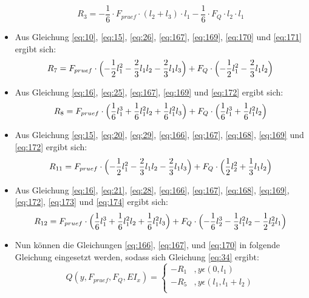 \begin{itemize}
\begin{equation}
		R_{3}=-\frac{1}{6}\cdot F_{pruef}\cdot (l_{2}+l_{3})\cdot l_{1} - \frac{1}{6}\cdot F_{Q}\cdot l_{2}\cdot l_{1}
	\end{equation}
	\item Aus Gleichung \ref{eq:10}, \ref{eq:15}, \ref{eq:26}, \ref{eq:167}, \ref{eq:169}, \ref{eq:170} und \ref{eq:171} ergibt sich:
	\begin{equation}\label{eq:172}
		R_{7}=F_{pruef}\cdot \Bigl(-\frac{1}{2} l_{1}^{2}-\frac{2}{3} l_{1}l_{2}-\frac{2}{3} l_{1}l_{3}\Bigr) + F_{Q}\cdot \Bigl(-\frac{1}{2} l_{1}^{2}-\frac{2}{3} l_{1}l_{2}\Bigr)
	\end{equation}
	\item Aus Gleichung \ref{eq:16}, \ref{eq:25}, \ref{eq:167}, \ref{eq:169} und \ref{eq:172} ergibt sich:
	\begin{equation}\label{eq:173}
		R_{8}=F_{pruef}\cdot \Bigl(\frac{1}{6} l_{1}^{3}+\frac{1}{6} l_{1}^{2}l_{2}+\frac{1}{6} l_{1}^{2}l_{3}\Bigr) + F_{Q}\cdot \Bigl(\frac{1}{6} l_{1}^{3}+\frac{1}{6} l_{1}^{2}l_{2}\Bigr)
	\end{equation}
	\item Aus Gleichung \ref{eq:15}, \ref{eq:20}, \ref{eq:29}, \ref{eq:166}, \ref{eq:167}, \ref{eq:168}, \ref{eq:169} und \ref{eq:172} ergibt sich:
	\begin{equation}\label{eq:174}
		R_{11}=F_{pruef}\cdot \Bigl(-\frac{1}{2} l_{1}^{2}-\frac{2}{3} l_{1}l_{2}-\frac{2}{3} l_{1}l_{3}\Bigr) + F_{Q}\cdot \Bigl(\frac{1}{2} l_{2}^{2}+\frac{1}{3} l_{1}l_{2}\Bigr)
	\end{equation}
	\item Aus Gleichung \ref{eq:16}, \ref{eq:21}, \ref{eq:28}, \ref{eq:166}, \ref{eq:167}, \ref{eq:168}, \ref{eq:169}, \ref{eq:172}, \ref{eq:173} und \ref{eq:174} ergibt sich:
	\begin{equation}\label{eq:175}
		R_{12}=F_{pruef}\cdot \Bigl(\frac{1}{6} l_{1}^{3}+\frac{1}{6} l_{1}^{2}l_{2}+\frac{1}{6} l_{1}^{2}l_{3}\Bigr) + F_{Q}\cdot \Bigl(-\frac{1}{6} l_{2}^{3}-\frac{1}{3} l_{1}^{2}l_{2}-\frac{1}{2} l_{2}^{2}l_{1}\Bigr)
	\end{equation}
	\item Nun können die Gleichungen \ref{eq:166}, \ref{eq:167}, und \ref{eq:170} in folgende Gleichung eingesetzt werden, sodass sich Gleichung \ref{eq:34} ergibt:
	\begin{equation}
		Q(y,F_{pruef},F_{Q},EI_{x})=\left\{\begin{array}{ll}
			-R_{1}&,y\epsilon (0,l_{1})\\
			-R_{5}&,y\epsilon (l_{1}, l_{1}+l_{2})\\

\end{array}
\end{equation}
\end{itemize}
